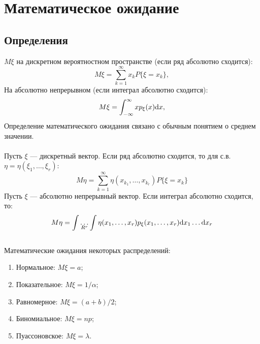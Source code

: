 \section{Математическое ожидание}

\subsection{Определения}
 $M\xi$ на дискретном вероятностном пространстве (если ряд абсолютно сходится):
\begin{equation*}
    M\xi = \sum_{k=1}^\infty x_k P\{\xi = x_k\},
\end{equation*}
На абсолютно непрерывном (если интеграл абсолютно сходится):
\begin{equation*}
    M\xi = \int_{-\infty}^\infty x p_\xi(x) \mathrm{d}{x},
\end{equation*}
Определение математического ожидания связано с обычным понятием о среднем значении.\\
\\
Пусть $\xi$ --- дискретный вектор.
Если ряд абсолютно сходится, то для с.в. $\eta = \eta(\xi_1, \ldots, \xi_r)$:
\begin{equation*}
    M\eta = \sum_{k=1}^\infty \eta(x_{k_1}, \ldots, x_{k_r}) P\{\xi = x_k\}
\end{equation*}
Пусть $\xi$ --- абсолютно непрерывный вектор.
Если интеграл абсолютно сходится, то:
\begin{equation*}
    M\eta = \int\underset{R^r}{\ldots}\int \eta(x_1, \ldots, x_r) p_\xi(x_1, \ldots, x_r) \mathrm{d}{x_1} \ldots \mathrm{d}{x_r}
\end{equation*}
\\
Математические ожидания некоторых распределений:
\begin{enumerate}
    \item Нормальное: $M\xi = a$;
    \item Показательное: $M\xi = 1/\alpha$;
    \item Равномерное: $M\xi = (a + b)/2$;
    \item Биномиальное: $M\xi = np$;
    \item Пуассоновское: $M\xi = \lambda$.
\end{enumerate}

